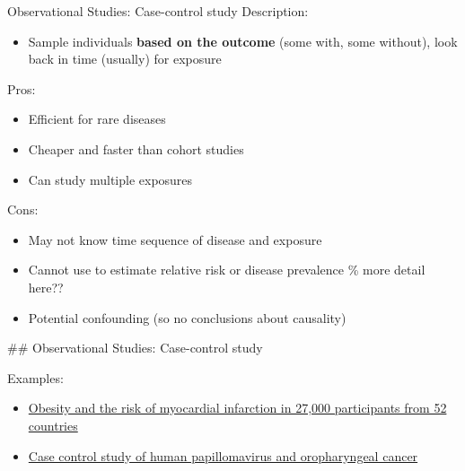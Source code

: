 \documentclass[
  ignorenonframetext,
]{beamer}
\providecommand{\tightlist}{%
  \setlength{\itemsep}{0pt}\setlength{\parskip}{0pt}}
\begin{document}
\begin{frame}{Observational Studies: Case-control study}
\protect\hypertarget{observational-studies-case-control-study-2}{}
Description:

\begin{itemize}
\tightlist
\item
  Sample individuals \textbf{based on the outcome} (some with, some
  without), look back in time (usually) for exposure
\end{itemize}

Pros:

\begin{itemize}
\tightlist
\item
  Efficient for rare diseases
\item
  Cheaper and faster than cohort studies
\item
  Can study multiple exposures
\end{itemize}

Cons:

\begin{itemize}
\tightlist
\item
  May not know time sequence of disease and exposure
\item
  Cannot use to estimate relative risk or disease prevalence \% more
  detail here??
\item
  Potential confounding (so no conclusions about causality)
\end{itemize}

\#\# Observational Studies: Case-control study

Examples:

\begin{itemize}
\tightlist
\item
  \href{https://www.sciencedirect.com/science/article/pii/S0140673605676635}{Obesity
  and the risk of myocardial infarction in 27,000 participants from 52
  countries}
\item
  \href{http://www.nejm.org/doi/full/10.1056/NEJMoa065497}{Case control
  study of human papillomavirus and oropharyngeal cancer}
\end{itemize}
\end{frame}
\end{document}
